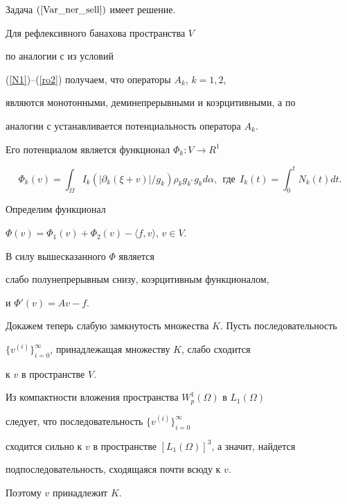 \begin{thmnonum}


Задача $(\ref{Var_ner_sell})$ имеет решение.


\end{thmnonum}





\begin{pf}


Для рефлексивного банахова пространства $V$ 


по аналогии с \cite{BZ_92IV} из условий


(\ref{N1})--(\ref{ro2}) получаем, что операторы $A_k$, $k=1,2$, 


являются монотонными, деминепрерывными и коэрцитивными, а по


аналогии с \cite{LBK_78IV} устанавливается потенциальность оператора $A_k$.


Его потенциалом является функционал $\Phi_k: V \to R^1$


$$


\Phi_k(v)=\int_\Omega I_k (|\partial_k (\xi+v ) | / g_k) 


\rho_k g_{k^*} g_k d\alpha,\ \ \text{где}\ \ I_k(t)=\int_0^t N_k(t) dt .


$$


Определим функционал


$\Phi (v)=\Phi_1(v)+\Phi_2(v)-\langle f, v \rangle$, $v \in V$. 


В силу вышесказанного $\Phi $ является


слабо полунепрерывным снизу, коэрцитивным функционалом,


и ${\Phi}'(v)=Av - f$. 





Докажем теперь слабую замкнутость множества $K$. Пусть последовательность 


$\{v^{(i)} \}_{i=0}^{\infty}$, принадлежащая множеству $K$, слабо сходится


к $v$ в пространстве $V$.


Из компактности вложения пространства ${W^1_p}(\Omega )$ в $L_1(\Omega)$


следует, что последовательность $\{v^{(i)} \}_{i=0}^{\infty}$


сходится сильно к $v$ в пространстве $[L_1(\Omega ) ]^3$, а значит, найдется


подпоследовательность, сходящаяся почти всюду к $v$.


Поэтому $v$ принадлежит $K$.






\end{pf}
